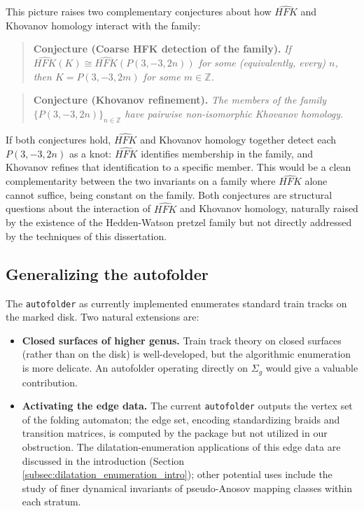 This picture raises two complementary conjectures about how $\widehat{HFK}$ and Khovanov homology interact with the family:

\begin{quote}
\textbf{Conjecture (Coarse HFK detection of the family).} \emph{If $\widehat{HFK}(K) \cong \widehat{HFK}(P(3,-3,2n))$ for some (equivalently, every) $n$, then $K = P(3,-3,2m)$ for some $m \in \mathbb{Z}$.}
\end{quote}

\begin{quote}
\textbf{Conjecture (Khovanov refinement).} \emph{The members of the family $\{P(3,-3,2n)\}_{n\in\mathbb{Z}}$ have pairwise non-isomorphic Khovanov homology.}
\end{quote}

If both conjectures hold, $\widehat{HFK}$ and Khovanov homology together detect each $P(3,-3,2n)$ as a knot: $\widehat{HFK}$ identifies membership in the family, and Khovanov refines that identification to a specific member. This would be a clean complementarity between the two invariants on a family where $\widehat{HFK}$ alone cannot suffice, being constant on the family. Both conjectures are structural questions about the interaction of $\widehat{HFK}$ and Khovanov homology, naturally raised by the existence of the Hedden-Watson pretzel family but not directly addressed by the techniques of this dissertation.

\subsection{Generalizing the autofolder}

The \texttt{autofolder} as currently implemented enumerates standard train tracks on the marked disk. Two natural extensions are:

\begin{itemize}
    \item \textbf{Closed surfaces of higher genus.}  Train track theory on closed surfaces (rather than on the disk) is well-developed, but the algorithmic enumeration is more delicate.  An autofolder operating directly on $\Sigma_g$ would give a valuable contribution.
    \item \textbf{Activating the edge data.} The current \texttt{autofolder} outputs the vertex set of the folding automaton; the edge set, encoding standardizing braids and transition matrices, is computed by the package but not utilized in our obstruction. The dilatation-enumeration applications of this edge data are discussed in the introduction (Section \ref{subsec:dilatation_enumeration_intro}); other potential uses include the study of finer dynamical invariants of pseudo-Anosov mapping classes within each stratum.
\end{itemize}

